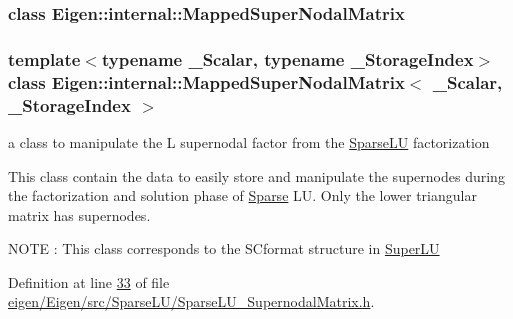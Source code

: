 \subsubsection{class Eigen\+:\+:internal\+:\+:Mapped\+Super\+Nodal\+Matrix}
\subsubsection*{template$<$typename \+\_\+\+Scalar, typename \+\_\+\+Storage\+Index$>$\newline
class Eigen\+::internal\+::\+Mapped\+Super\+Nodal\+Matrix$<$ \+\_\+\+Scalar, \+\_\+\+Storage\+Index $>$}

a class to manipulate the L supernodal factor from the \hyperlink{group___sparse_l_u___module_class_eigen_1_1_sparse_l_u}{Sparse\+LU} factorization 

This class contain the data to easily store and manipulate the supernodes during the factorization and solution phase of \hyperlink{struct_eigen_1_1_sparse}{Sparse} LU. Only the lower triangular matrix has supernodes.

N\+O\+TE \+: This class corresponds to the S\+Cformat structure in \hyperlink{class_eigen_1_1_super_l_u}{Super\+LU} 

Definition at line \hyperlink{eigen_2_eigen_2src_2_sparse_l_u_2_sparse_l_u___supernodal_matrix_8h_source_l00033}{33} of file \hyperlink{eigen_2_eigen_2src_2_sparse_l_u_2_sparse_l_u___supernodal_matrix_8h_source}{eigen/\+Eigen/src/\+Sparse\+L\+U/\+Sparse\+L\+U\+\_\+\+Supernodal\+Matrix.\+h}.

